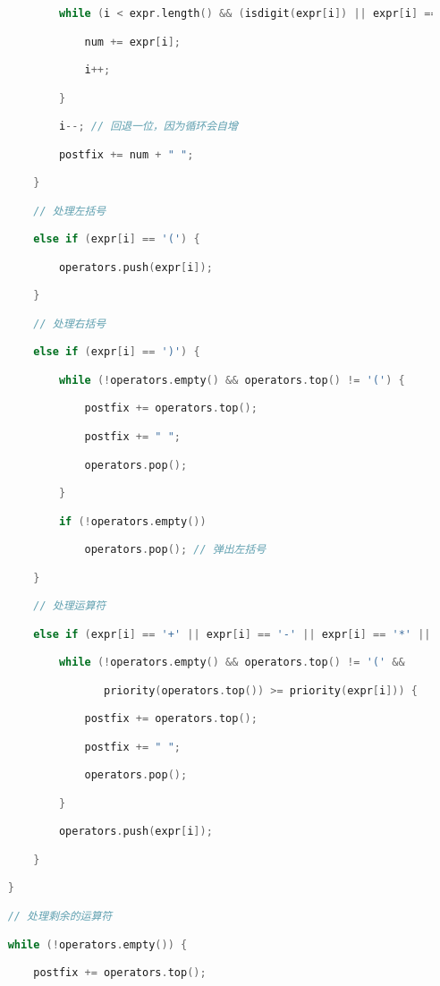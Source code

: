 \begin{lstlisting}[language=C++]
            while (i < expr.length() && (isdigit(expr[i]) || expr[i] == '.')) {

                num += expr[i];

                i++;

            }

            i--; // 回退一位，因为循环会自增

            postfix += num + " ";

        }

        // 处理左括号

        else if (expr[i] == '(') {

            operators.push(expr[i]);

        }

        // 处理右括号

        else if (expr[i] == ')') {

            while (!operators.empty() && operators.top() != '(') {

                postfix += operators.top();

                postfix += " ";

                operators.pop();

            }

            if (!operators.empty())

                operators.pop(); // 弹出左括号

        }

        // 处理运算符

        else if (expr[i] == '+' || expr[i] == '-' || expr[i] == '*' || expr[i] == '/' || expr[i] == '^') {

            while (!operators.empty() && operators.top() != '(' &&

                   priority(operators.top()) >= priority(expr[i])) {

                postfix += operators.top();

                postfix += " ";

                operators.pop();

            }

            operators.push(expr[i]);

        }

    }

    // 处理剩余的运算符

    while (!operators.empty()) {

        postfix += operators.top();


\end{lstlisting}
